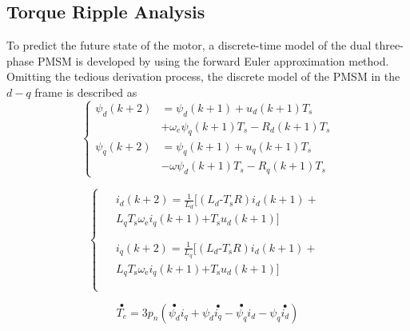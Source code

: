 \documentclass[sn-basic]{sn-jnl}
\theoremstyle{thmstyleone}%
\theoremstyle{thmstyletwo}%
\theoremstyle{thmstylethree}%
\theoremstyle{thmstyleone}%
\begin{document}
\subsection{Torque Ripple Analysis}



To predict the future state of the motor, a discrete-time model of the dual three-phase PMSM is developed by using the forward Euler approximation method. Omitting the tedious derivation process, the discrete model of the PMSM in the $d-q$ frame is described as
\begin{equation}\label{eq3}
\left\{\begin{aligned}
\psi_{d}(k+2) &=\psi_{d}(k+1)+u_{d}(k+1) T_{s} \\
&+\omega_{e} \psi_{q}(k+1) T_{s}-R_{d}(k+1) T_{s} \\
\psi_{q}(k+2) &=\psi_{q}(k+1)+u_{q}(k+1) T_{s}\\
&-\omega \psi_{d}(k+1) T_{s} -R_{q}(k+1) T_{s}
\end{aligned}\right.
\end{equation}

\begin{equation}
\left\{ \begin{array}{*{35}{l}}
   \begin{aligned}
  & {{i}_{d}}\left( k+2 \right)=\frac{1}{{{L}_{d}}}[\left( {{L}_{d}}\text{-}{{T}_{\text{s}}}R \right){{i}_{d}}\left( k+1 \right)+ \\ 
 & {{L}_{q}}{{T}_{\text{s}}}{{\omega }_{\text{e}}}{{i}_{q}}\left( k+1 \right)\text{+}{{T}_{\text{s}}}{{u}_{d}}\left( k+1 \right)] \\ 
\end{aligned}  \\
   \begin{aligned}
  & {{i}_{q}}\left( k+2 \right)=\frac{1}{{{L}_{q}}}[\left( {{L}_{d}}\text{-}{{T}_{\text{s}}}R \right){{i}_{d}}\left( k+1 \right)+ \\ 
 & {{L}_{q}}{{T}_{\text{s}}}{{\omega }_{\text{e}}}{{i}_{q}}\left( k+1 \right)\text{+}{{T}_{\text{s}}}{{u}_{d}}\left( k+1 \right)] \\ 
\end{aligned}  \\
\end{array} \right.
\end{equation}

\begin{equation}
\overset{\bullet}{T_{e}} = 3p_{n}\left( {\overset{\bullet}{\psi_{d}}i_{q} + \psi_{d}\overset{\bullet}{i_{q}} - \overset{\bullet}{\psi_{q}}i_{d} - \psi_{q}\overset{\bullet}{i_{d}}} \right)
\end{equation}
\end{document}
